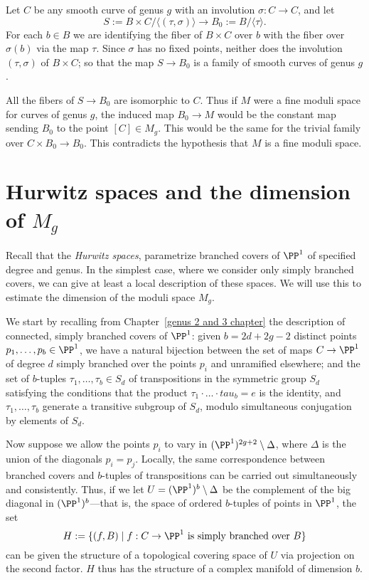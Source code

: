 Let $C$ be any smooth curve of genus $g$ with an involution $\sigma : C \to C$, and let 
$$
S := B \times C/\langle (\tau, \sigma) \rangle \to B_0 := B/\langle \tau \rangle.
$$
For each $b \in B$ we are identifying the fiber of $B \times C$ over $b$ with the fiber over $\sigma(b)$ via the map $\tau$. Since $\sigma$ has no fixed points, neither does the involution $(\tau, \sigma)$ of $B \times C$; so that the map $S \to B_0$ is a family of smooth curves of genus $g$.

All the fibers of $S \to B_0$ are isomorphic to $C$. Thus if $M$ were a fine moduli space for curves of genus $g$,
 the induced map $B_0 \to M$ would be the constant map sending $B_0$ to the point $[C] \in M_g$. This would be the
 same for the trivial family over $C\times B_0 \to B_0$. This contradicts the hypothesis that $M$ is a fine moduli space. 


\section{Hurwitz spaces and the dimension of $M_g$}\label{Hurwitz section}

Recall that the \emph{Hurwitz spaces},  parametrize branched covers of $\PP^1$ of specified degree and genus. In the simplest case, where we consider only simply branched covers, we can give at least a local description of these spaces. We will use this to estimate the dimension of the moduli space $M_g$.

We start by recalling from Chapter~\ref{genus 2 and 3 chapter} the description of connected, simply branched covers of $\PP^1$: given $b = 2d + 2g - 2$ distinct points $p_1,\dots,p_b \in \PP^1$, we have a natural bijection between the set of maps $C \to \PP^1$ of degree $d$ simply branched over the points $p_i$ and unramified elsewhere; and the set of $b$-tuples $\tau_1, \dots, \tau_b \in S_d$ of transpositions in the symmetric group $S_d$
satisfying the conditions that the product $\tau_1\cdot \dots \cdot tau_b = e$ is the identity, and $\tau_1, \dots, \tau_b$ generate a transitive subgroup of $S_d$, modulo simultaneous conjugation by elements of $S_d$. 

Now suppose we allow the points $p_i$ to vary in $(\PP^1)^{2g+2} \setminus \Delta$, where $\Delta$ is the union of the 
diagonals $p_i=p_j$. Locally, the same correspondence between branched covers and $b$-tuples of transpositions can be carried out simultaneously and consistently. Thus, if we let $U = (\PP^1)^b \setminus \Delta$ be the complement of the big diagonal in $(\PP^1)^b$---that is, the space of ordered $b$-tuples of points in $\PP^1$, the set
$$
H := \{ (f, B) \mid f : C \to \PP^1 \text{ is simply branched over } B \}
$$
can be given the structure of a topological covering space of $U$ via projection on the second factor. $H$ thus has the structure of a complex manifold of dimension $b$.

